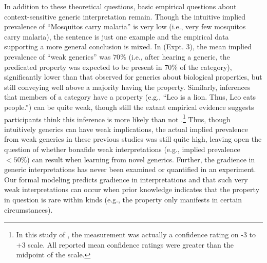 \documentclass[floatsintext,doc]{apa6}
\let\rmarkdownfootnote\footnote%
\def\footnote{\protect\rmarkdownfootnote}
\begin{document}
In addition to these theoretical questions, basic empirical questions about context-sensitive generic interpretation remain.
Though the intuitive implied prevalence of \enquote{Mosquitos carry malaria} is very low (i.e., very few mosquitos carry malaria), the sentence is just one example and the empirical data supporting a more general conclusion is mixed.
In \cite{Cimpian2010} (Expt. 3), the mean implied prevalence of \enquote{weak generics} was \(70\%\) (i.e., after hearing a generic, the predicated property was expected to be present in 70\% of the category), significantly lower than that observed for generics about biological properties, but still conveying well above a majority having the property.
Similarly, inferences that members of a category have a property (e.g., \enquote{Leo is a lion. Thus, Leo eats people.}) can be quite weak, though still the extant empirical evidence suggests participants think this inference is more likely than not \cite{Khemlani2012}.\footnote{In this study of , the measurement was actually a confidence rating on -3 to +3 scale. All reported mean confidence ratings were greater than the midpoint of the scale.}
Thus, though intuitively generics can have weak implications, the actual implied prevalence from weak generics in these previous studies was still quite high, leaving open the question of whether bonafide weak interpretations (e.g., implied prevalence \(<50\%\)) can result when learning from novel generics.
Further, the gradience in generic interpretations has never been examined or quantified in an experiment. 
Our formal modeling predicts gradience in interpretations and that such very weak interpretations can occur when prior knowledge indicates that the property in question is rare within kinds (e.g., the property only manifests in certain circumstances).
\end{document}
